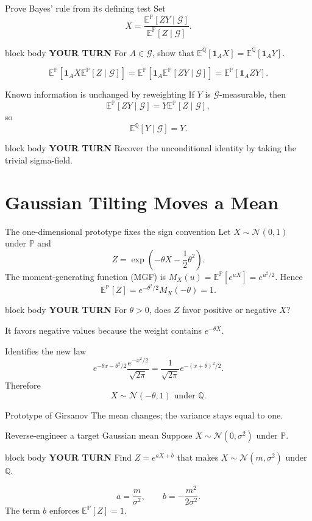 \documentclass[handout,10pt,aspectratio=169]{beamer}
\newenvironment{pausebox}{\begin{beamercolorbox}[rounded=true,sep=0.8em,wd=\textwidth]{block body}
  \textbf{\color{CourseGold}YOUR TURN}\quad}{\end{beamercolorbox}}
\newcommand{\E}{\mathbb E}
\newcommand{\Pp}{\mathbb P}
\newcommand{\Q}{\mathbb Q}
\newcommand{\1}{\mathbf 1}
\newcommand{\Nlaw}{\mathcal N}
\begin{document}
\begin{frame}{Prove Bayes' rule from its defining test}
Set
\[
X=\frac{\E^\Pp[ZY\mid\mathcal G]}
{\E^\Pp[Z\mid\mathcal G]}.
\]
\begin{pausebox}
For \(A\in\mathcal G\), show that
\(\E^\Q[\1_AX]=\E^\Q[\1_AY]\).
\end{pausebox}

\[
\E^\Pp[\1_AX\E^\Pp[Z\mid\mathcal G]]
=\E^\Pp[\1_A\E^\Pp[ZY\mid\mathcal G]]
=\E^\Pp[\1_AZY].
\]
\end{frame}

\begin{frame}{Known information is unchanged by reweighting}
If \(Y\) is \(\mathcal G\)-measurable, then
\[
\E^\Pp[ZY\mid\mathcal G]
=Y\E^\Pp[Z\mid\mathcal G],
\]
so
\[
\boxed{\E^\Q[Y\mid\mathcal G]=Y.}
\]
\begin{pausebox}
Recover the unconditional identity by taking the trivial sigma-field.
\end{pausebox}
\end{frame}

\section{Gaussian Tilting Moves a Mean}

\begin{frame}{The one-dimensional prototype fixes the sign convention}
Let \(X\sim\Nlaw(0,1)\) under \(\Pp\) and
\[
Z=\exp\!\left(-\theta X-\frac12\theta^2\right).
\]
The moment-generating function (MGF) is
\(M_X(u)=\E^\Pp[e^{uX}]=e^{u^2/2}\). Hence
\[
\E^\Pp[Z]=e^{-\theta^2/2}M_X(-\theta)=1.
\]
\begin{pausebox}
For \(\theta>0\), does \(Z\) favor positive or negative \(X\)?
\end{pausebox}

It favors negative values because the weight contains \(e^{-\theta X}\).
\end{frame}

\begin{frame}{Identifies the new law}
\[
e^{-\theta x-\theta^2/2}\frac{e^{-x^2/2}}{\sqrt{2\pi}}
=\frac1{\sqrt{2\pi}}e^{-(x+\theta)^2/2}.
\]
Therefore
\[
\boxed{X\sim\Nlaw(-\theta,1)\text{ under }\Q.}
\]
\begin{exampleblock}{Prototype of Girsanov}
The mean changes; the variance stays equal to one.
\end{exampleblock}
\end{frame}

\begin{frame}{Reverse-engineer a target Gaussian mean}
Suppose \(X\sim\Nlaw(0,\sigma^2)\) under \(\Pp\).
\begin{pausebox}
Find \(Z=e^{aX+b}\) that makes \(X\sim\Nlaw(m,\sigma^2)\) under \(\Q\).
\end{pausebox}

\[
\boxed{
a=\frac{m}{\sigma^2},
\qquad
b=-\frac{m^2}{2\sigma^2}.}
\]
The term \(b\) enforces \(\E^\Pp[Z]=1\).
\end{frame}
\end{document}
